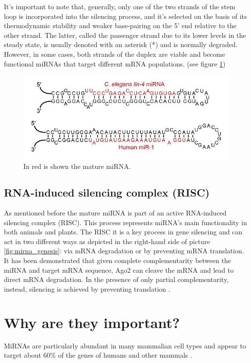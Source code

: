 It's important to note that, generally, only one of the two strands of the stem loop is incorporated into the silencing process, and it's selected on the basis of its thermodynamic stability and weaker base-pairing on the 5' end relative to the other strand. The latter, called the passenger strand due to its lower levels in the steady state, is usually denoted with an asterisk (*) and is normally degraded. However, in some cases, both strands of the duplex are viable and become functional miRNAs that target different mRNA populations. (see figure \ref{fig:mirna_stems})

\begin{figure}[hbt!]
	\centering
	\includegraphics[width=1.0\textwidth]{Figures/mirna_stems}
	\caption{ In red is shown the mature miRNA.}
	\label{fig:mirna_stems}
\end{figure}

\subsection{RNA-induced silencing complex (RISC)}
As mentioned before the mature miRNA is part of an active RNA-induced silencing complex (RISC). This process represents miRNA's main functionality in both animals and plants. 
The RISC it is a key process in gene silencing and can act in two different ways as depicted in the right-hand side of picture \ref{fig:mirna_genesis}: via mRNA degradation or by preventing mRNA translation. It has been demonstrated that given complete complementarity between the miRNA and target mRNA sequence, Ago2 can cleave the mRNA and lead to direct mRNA degradation. In the presence of only partial complementarity, instead, silencing is achieved by preventing translation \cite{cleavage}.
 

\section{Why are they important?}
MiRNAs are particularly abundant in many mammalian cell types and appear to target about 60\% of the genes of humans and other mammals \cite{conserved_pairing}.

